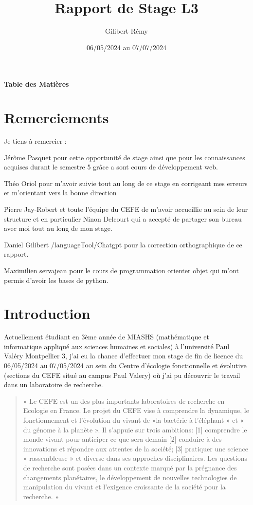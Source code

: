 \documentclass[
  10pt,
]{article}
\title{Rapport de Stage L3}
\author{Gilibert Rémy}
\date{06/05/2024 au 07/07/2024}
\begin{document}
\maketitle

\newpage

\thispagestyle{empty}
\begin{center}
  \Huge{\textbf{Table des Matières}}
\end{center}
\tableofcontents
\newpage

\section{Remerciements}\label{remerciements}

Je tiens à remercier :

Jérôme Pasquet pour cette opportunité de stage ainsi que pour les
connaissances acquises durant le semestre 5 grâce a sont cours de
développement web.

Théo Oriol pour m'avoir suivie tout au long de ce stage en corrigeant
mes erreurs et m'orientant vers la bonne direction

Pierre Jay-Robert et toute l'équipe du CEFE de m'avoir accueillie au
sein de leur structure et en particulier Ninon Delcourt qui a accepté de
partager son bureau avec moi tout au long de mon stage.

Daniel Gilibert /languageTool/Chatgpt pour la correction orthographique
de ce rapport.

Maximilien servajean pour le cours de programmation orienter objet qui
m'ont permis d'avoir les bases de python.

\newpage

\section{Introduction}\label{introduction}

Actuellement étudiant en 3ème année de MIASHS (mathématique et
informatique appliqué aux sciences humaines et sociales) à l'université
Paul Valéry Montpellier 3, j'ai eu la chance d'effectuer mon stage de
fin de licence du 06/05/2024 au 07/05/2024 au sein du Centre d'écologie
fonctionnelle et évolutive (sections du CEFE situé au campus Paul
Valery) où j'ai pu découvrir le travail dans un laboratoire de
recherche.

\begin{quote}
« Le CEFE est un des plus importants laboratoires de recherche en
Ecologie en France. Le projet du CEFE vise à comprendre la dynamique, le
fonctionnement et l'évolution du vivant de «la bactérie à l'éléphant »
et « du génome à la planète ». Il s'appuie sur trois ambitions: {[}1{]}
comprendre le monde vivant pour anticiper ce que sera demain {[}2{]}
conduire à des innovations et répondre aux attentes de la société;
{[}3{]} pratiquer une science « rassembleuse » et diverse dans ses
approches disciplinaires. Les questions de recherche sont posées dans un
contexte marqué par la prégnance des changements planétaires, le
développement de nouvelles technologies de manipulation du vivant et
l'exigence croissante de la société pour la recherche. »
\end{quote}
\end{document}
